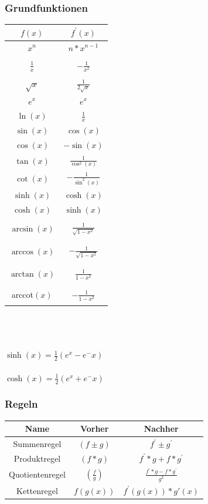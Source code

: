 \documentclass[12pt,a4paper]{article}
\begin{document}
		\subsubsection{Grundfunktionen}
			\begin{tabular}{c|c}
				 \hline
				$f(x)$ & $f^{'}(x)$ \\
				\hline
				$x^{n}$ & $n*x^{n-1}$ \\
				\hline\\
				$\frac{1}{x}$ & $- \frac{1}{x^2}$ \\\\
				\hline
				$\sqrt{x}$ & $\frac{1}{2\sqrt{x}}$\\
				\hline
				$e^{x}$ & $e^{x}$ \\
				\hline
				$\ln(x)$ & $\frac{1}{x}$ \\
				\hline
				$\sin{(x)}$ & $\cos{(x)}$ \\
				\hline
				$\cos{(x)}$ & $-\sin{(x)}$ \\
				\hline 
				$\tan{(x)}$ & $\frac{1}{\cos^2(x)}$\\
				\hline 
				$\cot{(x)}$ & $-\frac{1}{\sin^2(x)}$\\
				\hline
				$\sinh{(x)}$ & $\cosh{(x)}$ \\
				\hline
				$\cosh{(x)}$ & $\sinh{(x)}$ \\
				\hline\\
				$\arcsin(x)$ & $\frac{1}{\sqrt{1-x^2}}$\\\\
				\hline\\
				$\arccos(x)$ & $-\frac{1}{\sqrt{1-x^2}}$\\\\
				\hline\\
				$\arctan(x)$ & $\frac{1}{1-x^2}$\\\\
				\hline\\
				arccot$(x)$ & $-\frac{1}{1-x^2}$\\\\
			\end{tabular}\\\\\\
			$\sinh{(x)} = \frac{1}{2}(e^x-e^-x)$ \\\\
			$\cosh{(x)} = \frac{1}{2}(e^x+e^-x)$ 

		\subsubsection{Regeln}
			\begin{tabular}{|c|c|c|}
				 \hline
				Name & Vorher & Nachher \\
				\hline
				Summenregel & $(f\pm g)$ & $f^{'} \pm g^{'}$ \\
				\hline
				Produktregel & $(f*g)$ & $f^{'} *g + f* g^{'}$ \\
				\hline
				Quotientenregel & $(\frac{f}{g})$ & $\frac{f^{'}*g-f*g^{'}}{g^{2}}$ \\
				\hline
				Kettenregel & $f(g(x))$ & $f^{'}(g(x))*g'(x)$ \\
				\hline
			\end{tabular}
\end{document}

